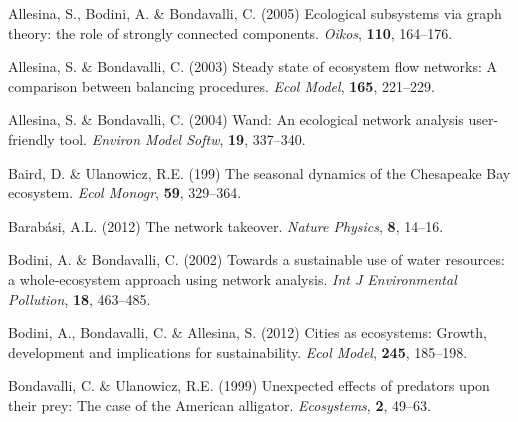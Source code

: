 \documentclass[11pt]{article}
\begin{document}
%
\begin{thebibliography}{75}
\providecommand{\natexlab}[1]{#1}

Allesina, S., Bodini, A. \& Bondavalli, C. (2005) Ecological subsystems via
  graph theory: the role of strongly connected components.
\newblock \emph{Oikos}, \textbf{110}, 164--176.

Allesina, S. \& Bondavalli, C. (2003) Steady state of ecosystem flow networks:
  A comparison between balancing procedures.
\newblock \emph{Ecol Model}, \textbf{165}, 221--229.

Allesina, S. \& Bondavalli, C. (2004) Wand: An ecological network analysis
  user-friendly tool.
\newblock \emph{Environ Model Softw}, \textbf{19}, 337--340.

Baird, D. \& Ulanowicz, R.E. (199) The seasonal dynamics of the {Chesapeake
  Bay} ecosystem.
\newblock \emph{Ecol Monogr}, \textbf{59}, 329--364.

Barab{\'a}si, A.L. (2012) The network takeover.
\newblock \emph{Nature Physics}, \textbf{8}, 14--16.

Bodini, A. \& Bondavalli, C. (2002) Towards a sustainable use of water
  resources: a whole-ecosystem approach using network analysis.
\newblock \emph{Int J Environmental Pollution}, \textbf{18}, 463--485.

Bodini, A., Bondavalli, C. \& Allesina, S. (2012) Cities as ecosystems: Growth,
  development and implications for sustainability.
\newblock \emph{Ecol Model}, \textbf{245}, 185--198.

Bondavalli, C. \& Ulanowicz, R.E. (1999) Unexpected effects of predators upon
  their prey: {T}he case of the {A}merican alligator.
\newblock \emph{Ecosystems}, \textbf{2}, 49--63.


\end{thebibliography}
\end{document}
